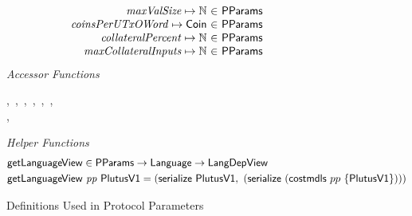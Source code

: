 \begin{figure*}[htb]
\begin{equation*}
\begin{array}{r@{~\in~}l@{\qquad}r}
        \var{maxValSize} \mapsto \N & \PParams \\
        \var{coinsPerUTxOWord} \mapsto \Coin & \PParams \\
        \var{collateralPercent} \mapsto \N & \PParams \\
        \var{maxCollateralInputs} \mapsto \N & \PParams \\
      \end{array}
  \end{equation*}
  \emph{Accessor Functions}
  \begin{center}
    ,~,~,~,~,~,\\
    ,~
  \end{center}
  \emph{Helper Functions}
  \begin{align*}
    & \mathsf{getLanguageView} \in \mathsf{PParams} \to \mathsf{Language} \to \mathsf{LangDepView} \\
    & \mathsf{getLanguageView}~\mathit{pp}~\mathsf{PlutusV1} = (\mathsf{serialize}~\mathsf{PlutusV1}, ~ (\mathsf{serialize}~(\mathsf{costmdls}~{pp}~\{\mathsf{PlutusV1}\})))
  \end{align*}
  \caption{Definitions Used in Protocol Parameters}
  \label{fig:defs:protocol-parameters}
\end{figure*}
